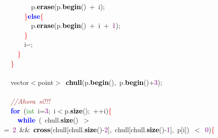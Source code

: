 \mbox{}\ \ \ \ \ \ \ \ p\textcolor{BrickRed}{.}\textbf{\textcolor{Black}{erase}}\textcolor{BrickRed}{(}p\textcolor{BrickRed}{.}\textbf{\textcolor{Black}{begin}}\textcolor{BrickRed}{()}\ \textcolor{BrickRed}{+}\ i\textcolor{BrickRed}{);} \\
\mbox{}\ \ \ \ \ \ \textcolor{Red}{\}}\textbf{\textcolor{Blue}{else}}\textcolor{Red}{\{} \\
\mbox{}\ \ \ \ \ \ \ \ p\textcolor{BrickRed}{.}\textbf{\textcolor{Black}{erase}}\textcolor{BrickRed}{(}p\textcolor{BrickRed}{.}\textbf{\textcolor{Black}{begin}}\textcolor{BrickRed}{()}\ \textcolor{BrickRed}{+}\ i\ \textcolor{BrickRed}{+}\ \textcolor{Purple}{1}\textcolor{BrickRed}{);} \\
\mbox{}\ \ \ \ \ \ \textcolor{Red}{\}} \\
\mbox{}\ \ \ \ \ \ i\textcolor{BrickRed}{-\/-;} \\
\mbox{}\ \ \ \ \textcolor{Red}{\}} \\
\mbox{}\ \ \textcolor{Red}{\}} \\
\mbox{}\ \  \\
\mbox{}\ \ vector\textcolor{BrickRed}{$<$}point\textcolor{BrickRed}{$>$}\ \textbf{\textcolor{Black}{chull}}\textcolor{BrickRed}{(}p\textcolor{BrickRed}{.}\textbf{\textcolor{Black}{begin}}\textcolor{BrickRed}{(),}\ p\textcolor{BrickRed}{.}\textbf{\textcolor{Black}{begin}}\textcolor{BrickRed}{()+}\textcolor{Purple}{3}\textcolor{BrickRed}{);} \\
\mbox{} \\
\mbox{}\ \ \textit{\textcolor{Brown}{//Ahora\ sí!!!}} \\
\mbox{}\ \ \textbf{\textcolor{Blue}{for}}\ \textcolor{BrickRed}{(}\textcolor{ForestGreen}{int}\ i\textcolor{BrickRed}{=}\textcolor{Purple}{3}\textcolor{BrickRed}{;}\ i\textcolor{BrickRed}{$<$}p\textcolor{BrickRed}{.}\textbf{\textcolor{Black}{size}}\textcolor{BrickRed}{();}\ \textcolor{BrickRed}{++}i\textcolor{BrickRed}{)}\textcolor{Red}{\{} \\
\mbox{}\ \ \ \ \textbf{\textcolor{Blue}{while}}\ \textcolor{BrickRed}{(}\ chull\textcolor{BrickRed}{.}\textbf{\textcolor{Black}{size}}\textcolor{BrickRed}{()}\ \textcolor{BrickRed}{$>$=}\ \textcolor{Purple}{2}\ \textcolor{BrickRed}{\&\&}\ \textbf{\textcolor{Black}{cross}}\textcolor{BrickRed}{(}chull\textcolor{BrickRed}{[}chull\textcolor{BrickRed}{.}\textbf{\textcolor{Black}{size}}\textcolor{BrickRed}{()-}\textcolor{Purple}{2}\textcolor{BrickRed}{],}\ chull\textcolor{BrickRed}{[}chull\textcolor{BrickRed}{.}\textbf{\textcolor{Black}{size}}\textcolor{BrickRed}{()-}\textcolor{Purple}{1}\textcolor{BrickRed}{],}\ p\textcolor{BrickRed}{[}i\textcolor{BrickRed}{])}\ \textcolor{BrickRed}{$<$}\ \textcolor{Purple}{0}\textcolor{BrickRed}{)}\textcolor{Red}{\{} \\
